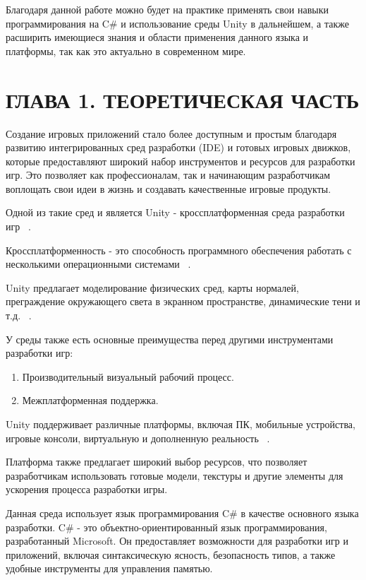 \documentclass[14pt, oneside]{altsu-report}
\begin{document}
Благодаря данной работе можно будет на практике применять свои навыки программирования на C\# и использование среды Unity в дальнейшем, а также расширить имеющиеся знания и области применения данного языка и платформы, так как это актуально в современном мире.


\chapter{ГЛАВА 1. ТЕОРЕТИЧЕСКАЯ ЧАСТЬ} 

Создание игровых приложений стало более доступным и простым благодаря развитию интегрированных сред разработки (IDE) и готовых игровых движков, которые предоставляют широкий набор инструментов и ресурсов для разработки игр. Это позволяет как профессионалам, так и начинающим разработчикам воплощать свои идеи в жизнь и создавать качественные игровые продукты.

Одной из такие сред и является Unity - кроссплатформенная среда разработки игр ~\cite{Unity18}.  

Кроссплатформенность - это способность программного обеспечения работать с несколькими операционными системами ~\cite{Unity19}. 

Unity предлагает моделирование физических сред, карты нормалей, преграждение окружающего света в экранном пространстве, динамические тени и т.д.  ~\cite{Unity20}. 

У среды также есть основные преимущества перед другими инструментами разработки игр:

\begin{enumerate}
\item Производительный визуальный рабочий процесс.
\item Межплатформенная поддержка.
\end{enumerate} 

Unity поддерживает различные платформы, включая ПК, мобильные устройства, игровые консоли, виртуальную и дополненную реальность ~\cite{Unity, Unity2, Unity5}.

Платформа также предлагает широкий выбор ресурсов, что позволяет разработчикам использовать готовые модели, текстуры и другие элементы для ускорения процесса разработки игры. 

Данная среда использует язык программирования C\# в качестве основного языка разработки. C\# - это объектно-ориентированный язык программирования, разработанный Microsoft. Он предоставляет возможности для разработки игр и приложений, включая синтаксическую ясность, безопасность типов, а также удобные инструменты для управления памятью.
\end{document}
